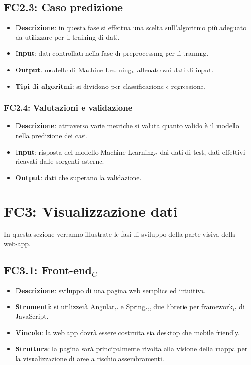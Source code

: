 \subsection{FC2.3: Caso predizione}\label{fasiProgettoElaborazioneDatiCasoPredizione}

\begin{itemize}
	\item \textbf{Descrizione}: in questa fase si effettua una scelta sull'algoritmo più adeguato da utilizzare per il training di dati.
	\item \textbf{Input}: dati controllati nella fase di preprocessing per il training.
	\item \textbf{Output}: modello di Machine Learning$_{\scaleto{G}{3pt}}$ allenato sui dati di input.
	\item \textbf{Tipi di algoritmi}: si dividono per classificazione e regressione.%
\end{itemize}

\subsubsection{FC2.4: Valutazioni e validazione}\label{fasiProgettoElaborazioneDatiValutazioniValidazione}

\begin{itemize}
	\item \textbf{Descrizione}: attraverso varie metriche si valuta quanto valido è il modello nella predizione dei casi.
	\item \textbf{Input}: risposta del modello Machine Learning$_{\scaleto{G}{3pt}}$ dai dati di test, dati effettivi ricavati dalle sorgenti esterne.
	\item \textbf{Output}: dati che superano la validazione.
\end{itemize}

\section{FC3: Visualizzazione dati}\label{fasiProgettoVisualizzazioneDati}
In questa sezione verranno illustrate le fasi di sviluppo della parte visiva della web-app.

\subsection{FC3.1: Front-end$_G$}\label{fasiProgettoVisualizzazioneDatiFrontEnd}

\begin{itemize}
	\item \textbf{Descrizione}: sviluppo di una pagina web semplice ed intuitiva.
	\item \textbf{Strumenti}: si utilizzerà Angular$_G$ e Spring$_G$, due librerie per framework$_G$ di JavaScript.
	\item \textbf{Vincolo}: la web app dovrà essere costruita sia desktop che mobile friendly. 
	\item \textbf{Struttura}: la pagina sarà principalmente rivolta alla visione della mappa per la visualizzazione di aree a rischio assembramenti.
\end{itemize}

